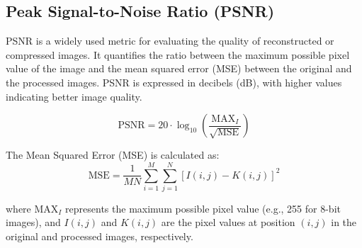 \documentclass[conference]{IEEEtran}
\begin{document}

\subsection{Peak Signal-to-Noise Ratio (PSNR)}
PSNR is a widely used metric for evaluating the quality of reconstructed or compressed images. It quantifies the ratio between the maximum possible pixel value of the image and the mean squared error (MSE) between the original and the processed images. PSNR is expressed in decibels (dB), with higher values indicating better image quality.

\begin{equation}
\text{PSNR} = 20 \cdot \log_{10}\left(\frac{\text{MAX}_{I}}{\sqrt{\text{MSE}}}\right)
\end{equation}

The Mean Squared Error (MSE) is calculated as:
\begin{equation}
\text{MSE} = \frac{1}{MN} \sum_{i=1}^{M} \sum_{j=1}^{N} \left[I(i,j) - K(i,j)\right]^2
\end{equation}

where \(\text{MAX}_{I}\) represents the maximum possible pixel value (e.g., 255 for 8-bit images), and \(I(i,j)\) and \(K(i,j)\) are the pixel values at position \((i,j)\) in the original and processed images, respectively.

\begin{table}[H]
    \caption{PSNR Error Analysis of Various Sample Images}
    \centering
    \renewcommand{\arraystretch}{1.8} %
    \label{tab:psnr_error_analysis}
\end{table}
\end{document}
